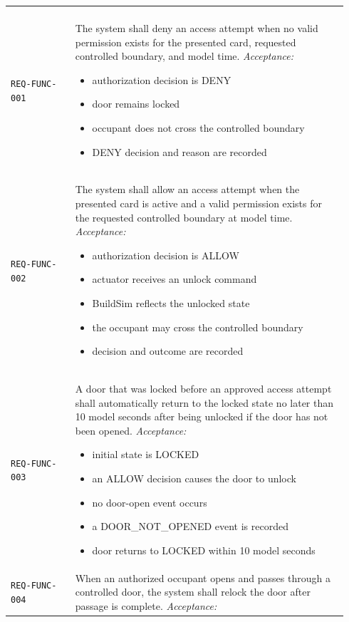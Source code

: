 \documentclass[11pt]{article}
\providecommand{\tightlist}{\setlength{\itemsep}{0pt}\setlength{\parskip}{0pt}}
\begin{document}
\begin{longtable}[]{@{}
>{\raggedright\arraybackslash}p{0.18\linewidth}
>{\raggedright\arraybackslash}p{0.76\linewidth}@{}}
\multicolumn{2}{@{}l}{\textbf{Core functional requirements}} \\[2pt]
\texttt{REQ-FUNC-001} & The system shall deny an access attempt when no valid permission exists for the presented card, requested controlled boundary, and model time.
\textit{Acceptance:}
\begin{itemize}\tightlist
\item authorization decision is DENY
\item door remains locked
\item occupant does not cross the controlled boundary
\item DENY decision and reason are recorded
\end{itemize} \\
\addlinespace[3pt]
\texttt{REQ-FUNC-002} & The system shall allow an access attempt when the presented card is active and a valid permission exists for the requested controlled boundary at model time.
\textit{Acceptance:}
\begin{itemize}\tightlist
\item authorization decision is ALLOW
\item actuator receives an unlock command
\item BuildSim reflects the unlocked state
\item the occupant may cross the controlled boundary
\item decision and outcome are recorded
\end{itemize} \\
\addlinespace[3pt]
\texttt{REQ-FUNC-003} & A door that was locked before an approved access attempt shall automatically return to the locked state no later than 10 model seconds after being unlocked if the door has not been opened.
\textit{Acceptance:}
\begin{itemize}\tightlist
\item initial state is LOCKED
\item an ALLOW decision causes the door to unlock
\item no door-open event occurs
\item a DOOR\_NOT\_OPENED event is recorded
\item door returns to LOCKED within 10 model seconds
\end{itemize} \\
\addlinespace[3pt]
\texttt{REQ-FUNC-004} & When an authorized occupant opens and passes through a controlled door, the system shall relock the door after passage is complete.
\textit{Acceptance:}

\end{longtable}
\end{document}
